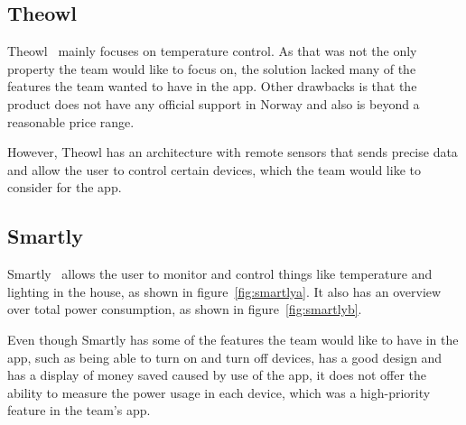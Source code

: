 \subsection{Theowl}

Theowl~\cite{theowl} mainly focuses on temperature control. 
As that was not the only property the team would like to focus on, the solution lacked many of the features the team wanted to have in the app. Other drawbacks is that the product does not have any official support in Norway and also is beyond a reasonable price range. 

However, Theowl has an architecture with remote sensors that sends precise data and allow the user to control certain devices, which the team would like to consider for the app.


\subsection{Smartly}

Smartly~\cite{smartly} allows the user to monitor and control things like temperature and lighting in the house, as shown in figure~\ref{fig:smartlya}. It also has an overview over total power consumption, as shown in figure~\ref{fig:smartlyb}.

Even though Smartly has some of the features the team would like to have in the app, such as being able to turn on and turn off devices, has a good design and has a display of money saved caused by use of the app, it does not offer the ability to measure the power usage in each device, which was a high-priority feature in the team's app.


